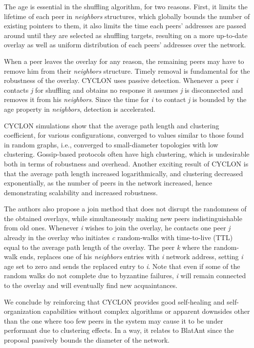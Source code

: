 \documentclass[runningheads]{llncs}
\begin{document}
The age is essential in the shuffling algorithm, for two reasons. First, it limits the lifetime of each peer in \textit{neighbors} structures, which globally bounds the number of existing pointers to them, it also limits the time each peers' addresses are passed around until they are selected as shuffling targets, resulting on a more up-to-date overlay as well as uniform distribution of each peers' addresses over the network.

When a peer leaves the overlay for any reason, the remaining peers may have to remove him from their \textit{neighbors} structure. Timely removal is fundamental for the robustness of the overlay.  CYCLON uses passive detection. Whenever a peer \textit{i} contacts \textit{j} for shuffling and obtains no response it assumes \textit{j} is disconnected and removes it from his \textit{neighbors}. Since the time for \textit{i} to contact \textit{j} is bounded by the age property in \textit{neighbors}, detection is accelerated.

CYCLON simulations show that the average path length and clustering coefficient, for various configurations, converged to values similar to those found in random graphs, i.e., converged to small-diameter topologies with low clustering. Gossip-based protocols often have high clustering, which is undesirable both in terms of robustness and overhead. Another exciting result of CYCLON is that the average path length increased logarithmically, and clustering decreased exponentially, as the number of peers in the network increased, hence demonstrating scalability and increased robustness.

The authors also propose a join method that does not disrupt the randomness of the obtained overlays, while simultaneously making new peers indistinguishable from old ones. Whenever \textit{i} wishes to join the overlay, he contacts one peer \textit{j} already in the overlay who initiates \textit{c} random-walks with time-to-live (TTL) equal to the average path length of the overlay. The peer \textit{k} where the random-walk ends, replaces one of his \textit{neighbors} entries with \textit{i} network address, setting \textit{i} age set to zero and sends the replaced entry to \textit{i}. Note that even if some of the random walks do not complete due to byzantine failures, \textit{i} will remain connected to the overlay and will eventually find new acquaintances.

We conclude by reinforcing that CYCLON provides good self-healing and self-organization capabilities without complex algorithms or apparent downsides other than the one where too few peers in the system may cause it to be under performant due to clustering effects. In a way, it relates to BlatAnt since the proposal passively bounds the diameter of the network.
\end{document}
